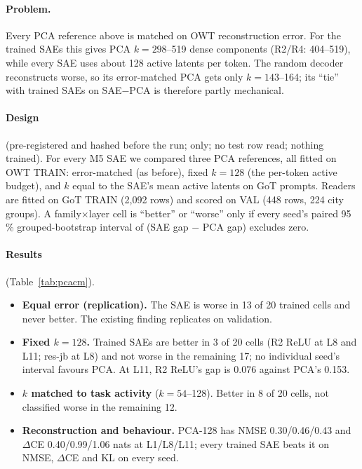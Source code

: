 \paragraph{Problem.} Every PCA reference above is matched on OWT reconstruction error. For the trained SAEs this gives
PCA $k=298$--519 dense components (R2/R4: 404--519), while every SAE uses about 128 active latents per token. The
random decoder reconstructs worse, so its error-matched PCA gets only $k=143$--164; its ``tie'' with trained SAEs on
SAE$-$PCA is therefore partly mechanical.

\paragraph{Design} (pre-registered and hashed before the run;  only; no test row read; nothing
trained). For every M5 SAE we compared three PCA references, all fitted on OWT TRAIN: error-matched (as before),
fixed $k=128$ (the per-token active budget), and $k$ equal to the SAE's mean active latents on GoT prompts. Readers
are fitted on GoT TRAIN (2,092 rows) and scored on VAL (448 rows, 224 city groups). A family$\times$layer cell is
``better'' or ``worse'' only if every seed's paired 95\,\% grouped-bootstrap interval of (SAE gap $-$ PCA gap)
excludes zero.

\paragraph{Results} (Table~\ref{tab:pcacm}).
\begin{itemize}
\item \textbf{Equal error (replication).} The SAE is worse in 13 of 20 trained cells and never better. The existing
  finding replicates on validation.
\item \textbf{Fixed $k=128$.} Trained SAEs are better in 3 of 20 cells (R2 ReLU at L8 and L11; res-jb at L8) and not
  worse in the remaining 17; no individual seed's interval favours PCA. At L11, R2 ReLU's gap is 0.076 against PCA's
  0.153.
\item \textbf{$k$ matched to task activity} ($k=54$--128). Better in 8 of 20 cells, not classified worse in the remaining 12.
\item \textbf{Reconstruction and behaviour.} PCA-128 has NMSE 0.30/0.46/0.43 and $\Delta$CE 0.40/0.99/1.06 nats at
  L1/L8/L11; every trained SAE beats it on NMSE, $\Delta$CE and KL on every seed.
\end{itemize}

